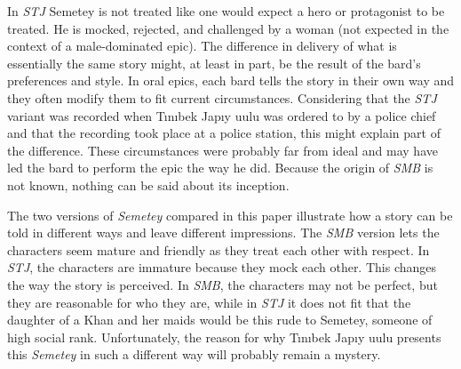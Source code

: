 \documentclass[12pt,a4paper]{article}
\newcommand{\Se} {Semetey}
\newcommand{\Mbs}{\emph{SMB}}
\newcommand{\Tj} {Tınıbek Japıy uulu}
\newcommand{\Tjs}{\emph{STJ}}
\begin{document}
In \Tjs{} \Se{} is not treated like one would
expect a hero or protagonist to be treated. He is mocked, rejected, and
challenged by a woman (not expected in the context of a male-dominated epic).
The difference in delivery of what is essentially the same story might, at
least in part, be the result of the bard's preferences and style. In oral
epics,
each bard tells the story in their own way and they often modify them to fit
current circumstances. Considering that the \Tjs{} variant was recorded when
\Tj{} was ordered to by a police chief and that the recording took place at
a police station, this might explain part of the difference. These
circumstances were probably far from ideal and may have led the bard to perform
the epic the way he did. Because the origin of \Mbs{} is not known, nothing can
be said about its inception.

The two versions of \emph{\Se{}} compared in this paper
illustrate how a story can be told in different ways and leave 
different impressions. The \Mbs{} version lets the characters seem mature and 
friendly as they treat each other with respect. In \Tjs{}, the characters 
are immature because they mock each other.
This changes the way the story is perceived. In \Mbs{}, the characters
may not be perfect, but they are reasonable for who they are, while in \Tjs{}
it does not fit that the daughter of a Khan and her maids would be this
rude to \Se{}, someone of high social rank. Unfortunately, the reason for why \Tj{}
presents this \emph{\Se{}} in such a different way will probably remain
a mystery.
\end{document}
